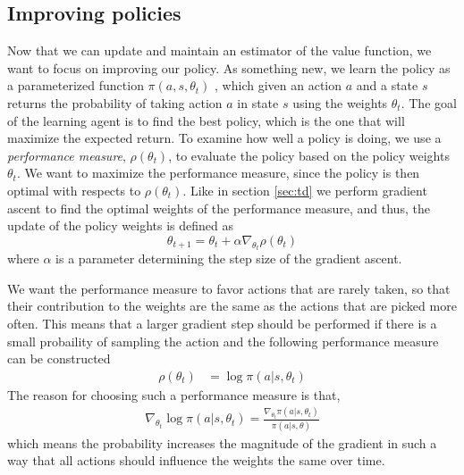 \documentclass[11pt]{article}
\begin{document}
\subsection{Improving policies}

Now that we can update and maintain an estimator of the value function, we want
to focus on improving our policy.
As something new, we learn the policy as a parameterized function $\pi(a, s, \theta_t)$
, which given an action $a$ and a state $s$ returns the probability
of taking action $a$ in state $s$ using the weights $\theta_t$.
The goal of the learning agent is to find the best policy, which is the one 
that will maximize the expected return.
To examine how well a policy is doing, we use a \textit{performance measure}, $\rho(\theta_t)$, to evaluate
the policy based on the policy weights $\theta_t$.
We want to maximize the performance measure, since the policy is then optimal with
respects to $\rho(\theta_t)$.
Like in section \ref{sec:td}
we perform gradient ascent to find the optimal weights of the performance measure,
and thus, the update of the policy weights is defined as
\begin{equation}
    \theta_{t+1} = \theta_t + \alpha \nabla_{\theta_t} \rho(\theta_t)
\end{equation}
where $\alpha$ is a parameter determining the step size of the gradient ascent.

We want the performance measure to favor actions that are rarely taken, so that
their contribution to the weights are the same as the actions that are
picked more often.
This means that a larger gradient step should be performed if there is a small probaility
of sampling the action and the following performance measure can be constructed
\begin{equation}
    \begin{aligned}
        \rho(\theta_t) & = \log\pi(a|s, \theta_t)
    \end{aligned}
\end{equation}
The reason for choosing such a performance measure is that,
\begin{equation}\label{per_mes}
    \begin{aligned}
        \nabla_{\theta_t} \log\pi(a|s, \theta_t) = \frac{\nabla_{\theta_t}\pi(a|s, \theta_t)}{\pi(a|s,\theta)}
    \end{aligned}
\end{equation}
which means the probability increases the magnitude of the gradient
in such a way that all actions should influence the
weights the same over time.
\end{document}

